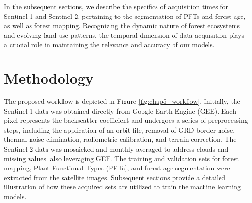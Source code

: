 In the subsequent sections, we describe the specifics of acquisition times for Sentinel 1 and Sentinel 2, pertaining to the segmentation of PFTs and forest age, as well as forest mapping. Recognizing the dynamic nature of forest ecosystems and evolving land-use patterns, the temporal dimension of data acquisition plays a crucial role in maintaining the relevance and accuracy of our models. \par

\section{Methodology} \label{chap5_method}
The proposed workflow is depicted in Figure \ref{fig:chap5_workflow}. Initially, the Sentinel 1 data was obtained directly from Google Earth Engine (GEE). Each pixel represents the backscatter coefficient and undergoes a series of preprocessing steps, including the application of an orbit file, removal of GRD border noise, thermal noise elimination, radiometric calibration, and terrain correction. The Sentinel 2 data was mosaicked and monthly averaged to address clouds and missing values, also leveraging GEE. The training and validation sets for forest mapping, Plant Functional Types (PFTs), and forest age segmentation were extracted from the satellite images. Subsequent sections provide a detailed illustration of how these acquired sets are utilized to train the machine learning models. \par


